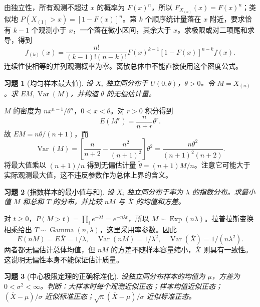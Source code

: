 \documentclass[UTF8,12pt,a4paper,fontset=fandol]{ctexart}
\newtheorem{exercise}{习题}[section]
\begin{document}
\begin{solve}\label{a:B8.7}由独立性，所有观测不超过 $x$ 的概率为 $F(x)^n$，所以 $F_{X_{(n)}}(x)=F(x)^n$；类似地 $P(X_{(1)}>x)=[1-F(x)]^n$。第 $k$ 个顺序统计量落在 $x$ 附近，要求恰有 $k-1$ 个观测小于 $x$，一个落在微小区间，其余大于 $x$。求极限或对二项尾和求导，得到\[f_{(k)}(x)=\frac{n!}{(k-1)!(n-k)!}F(x)^{k-1}[1-F(x)]^{n-k}f(x).\]连续性使相等的并列观测概率为零。离散总体中不能直接使用这个密度公式。\end{solve}

\begin{exercise}[均匀样本最大值]\label{q:B8.8}
设 $X_i$ 独立同分布于 $U(0,\theta)$，$\theta>0$。令 $M=X_{(n)}$。求 $EM,\operatorname{Var}(M)$，并构造 $\theta$ 的无偏估计量。\par{}
\end{exercise}

\begin{solve}\label{a:B8.8}$M$ 的密度为 $nx^{n-1}/\theta^n$，$0<x<\theta$。对 $r>0$ 积分得到\[E(M^r)=\frac{n}{n+r}\theta^r.\]故 $EM=n\theta/(n+1)$，而\[\operatorname{Var}(M)=\left[\frac{n}{n+2}-\frac{n^2}{(n+1)^2}\right]\theta^2=\frac{n\theta^2}{(n+1)^2(n+2)}.\]将最大值乘以 $(n+1)/n$ 得到无偏估计量 $\widetilde\theta=(n+1)M/n$。注意它可能大于实际观测最大值，这不违反参数作为总体上界的含义。\end{solve}

\begin{exercise}[指数样本的最小值与和]\label{q:B8.9}
设 $X_i$ 独立同分布于率为 $\lambda$ 的指数分布。求最小值 $M$ 和总和 $T$ 的分布，并比较 $nM$ 与 $\overline X$ 的均值和方差。\par{}
\end{exercise}

\begin{solve}\label{a:B8.9}对 $t\ge0$，$P(M>t)=\prod_i e^{-\lambda t}=e^{-n\lambda t}$，所以 $M\sim\operatorname{Exp}(n\lambda)$。拉普拉斯变换相乘给出 $T\sim\operatorname{Gamma}(n,\lambda)$，这里采用率参数。因此\[E(nM)=E\overline X=1/\lambda,\quad\operatorname{Var}(nM)=1/\lambda^2,\quad\operatorname{Var}(\overline X)=1/(n\lambda^2).\]两者都无偏估计总体均值，但 $nM$ 的方差不随样本容量缩小，$\overline X$ 则具有一致性。这说明无偏性本身不能保证估计质量。\end{solve}

\begin{exercise}[中心极限定理的正确标准化]\label{q:M-F-C13}
设独立同分布样本的均值为 $\mu$，方差为 $0<\sigma^2<\infty$。判断：大样本时每个观测近似正态；样本均值近似正态；$(\overline X-\mu)/\sigma$ 近似标准正态；$\sqrt n(\overline X-\mu)/\sigma$ 近似标准正态。\par{}
\end{exercise}
\end{document}
